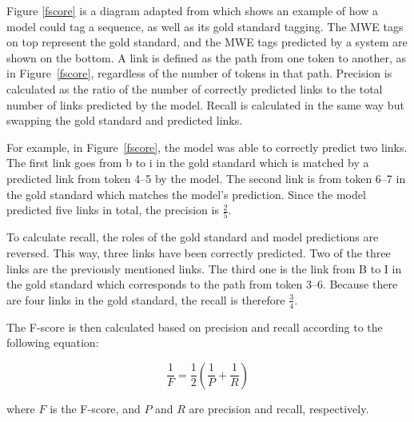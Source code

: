 \documentclass[11pt,a4paper]{article}
\newcommand{\figref}[1]{Figure~\ref{#1}}
\begin{document}
Figure \ref{fscore} is a diagram adapted from
 which shows an example of
how a model could tag a sequence, as well as its gold standard
tagging.  The MWE tags on top represent the gold standard, and the MWE
tags predicted by a system are shown on the bottom. A link is defined
as the path from one token to another, as in \figref{fscore},
regardless of the number of tokens in that path. Precision is
calculated as the ratio of the number of correctly predicted links to
the total number of links predicted by the model. Recall is calculated
in the same way but swapping the gold standard and predicted links.

For example, in \figref{fscore}, the model was able to correctly
predict two links.  The first link goes from
{\selectfont b} to {\selectfont i}
in the gold standard which is matched by a predicted link from token
4--5 by the model. The second link is from token 6--7 in the gold
standard which matches the model's prediction. Since the model
predicted five links in total, the precision is $\frac{2}{5}$.

To calculate recall, the roles of the gold standard and model
predictions are reversed. This way, three links have been correctly
predicted. Two of the three links are the previously mentioned
links. The third one is the link from {\selectfont B}
to {\selectfont I} in the gold standard which
corresponds to the path from token 3--6. Because there are four links
in the gold standard, the recall is therefore $\frac{3}{4}$.

The F-score is then calculated based on precision and recall according
to the following equation:

\begin{equation}
\frac{1}{F} = \frac{1}{2} (\frac{1}{P} + \frac{1}{R})
\end{equation}
\vspace{5mm}

\noindent
where $F$ is the F-score, and $P$ and $R$ are precision and recall,
respectively.


\end{document}
